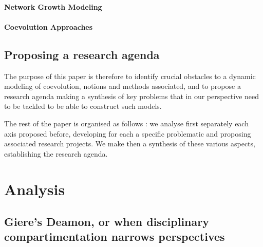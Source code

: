 \paragraph{Network Growth Modeling}


\paragraph{Coevolution Approaches}





\subsection{Proposing a research agenda}



The purpose of this paper is therefore to identify crucial obstacles to a dynamic modeling of coevolution, notions and methods associated, and to propose a research agenda making a synthesis of key problems that in our perspective need to be tackled to be able to construct such models.



The rest of the paper is organised as follows : we analyse first separately each axis proposed before, developing for each a specific problematic and proposing associated research projects. We make then a synthesis of these various aspects, establishing the research agenda.



\section{Analysis}



\subsection{Giere's Deamon, or when disciplinary compartimentation narrows perspectives}



